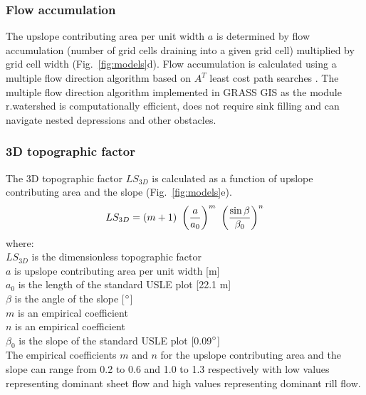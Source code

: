 \documentclass[gmd, manuscript]{copernicus}
\begin{document}

\subsubsection{Flow accumulation}
%
The upslope contributing area per unit width $a$
is determined by flow accumulation (number of grid cells draining into a given grid cell)
 multiplied by grid cell width (Fig.~\ref{fig:models}d). 
Flow accumulation is calculated using 
a multiple flow direction algorithm \citep{Metz2009} 
based on $A^{T}$ least cost path searches \citep{Ehlschlaeger1989}. 
The multiple flow direction algorithm 
implemented in GRASS GIS as the module r.watershed
is computationally efficient, does not require sink filling and can
navigate nested depressions and other obstacles. 


\subsubsection{3D topographic factor}
%
The 3D topographic factor $LS_{3D}$
is calculated as a function of upslope contributing area
and the slope (Fig.~\ref{fig:models}e). 
\begin{equation}
\label{eq:ls_factor}
LS_{3D} = (m+1) ~ \left({a \over a_0}\right)^m ~ \left({\sin \beta \over \beta_0}\right)^n
\end{equation}
%
{\small
\noindent
where: \\
\noindent
\hspace*{0.5em} $LS_{3D}$ is the dimensionless topographic factor\\
\hspace*{0.5em} $a$ is upslope contributing area per unit width [\unit{m}]\\
\hspace*{0.5em} $a_0$ is the length of the standard USLE plot [22.1 \unit{m}]\\
\hspace*{0.5em} $\beta$ is the angle of the slope [$^{\circ}$]\\
\hspace*{0.5em} $m$ is an empirical coefficient\\
\hspace*{0.5em} $n$ is an empirical coefficient\\
\hspace*{0.5em} $\beta_0$ is the slope of the standard USLE plot [0.09$^{\circ}$]\\
}
The empirical coefficients $m$ and $n$
for the upslope contributing area and the slope
can range from 0.2 to 0.6 and 1.0 to 1.3 respectively
with low values representing dominant sheet flow
and high values representing dominant rill flow.
%
\end{document}
